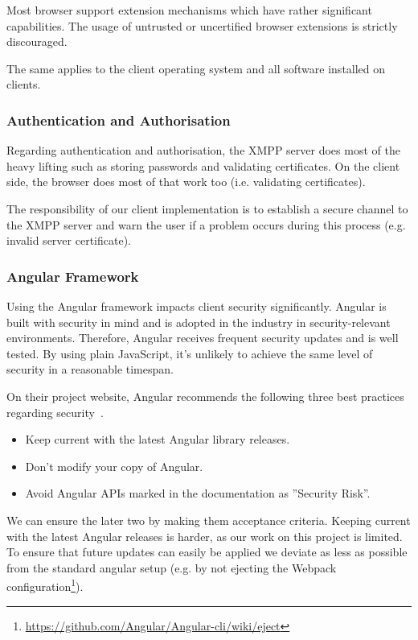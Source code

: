 Most browser support extension mechanisms which have rather significant capabilities.
The usage of untrusted or uncertified browser extensions is strictly discouraged.~\cite{browser-extension-security}

The same applies to the client operating system and all software installed on clients.

\subsubsection{Authentication and Authorisation}

Regarding authentication and authorisation, the XMPP server does most of the heavy lifting such as storing passwords and validating certificates.
On the client side, the browser does most of that work too (i.e. validating certificates).

The responsibility of our client implementation is to establish a secure channel to the XMPP server and warn the user if a problem occurs during this process (e.g. invalid server certificate).

\subsubsection{Angular Framework}

Using the Angular framework impacts client security significantly.
Angular is built with security in mind and is adopted in the industry in security-relevant environments.
Therefore, Angular receives frequent security updates and is well tested.
By using plain JavaScript, it's unlikely to achieve the same level of security in a reasonable timespan.

On their project website, Angular recommends the following three best practices regarding security~\cite{angular-security}.

\begin{itemize}
    \item Keep current with the latest Angular library releases.
    \item Don't modify your copy of Angular.
    \item Avoid Angular APIs marked in the documentation as ''Security Risk''.
\end{itemize}

We can ensure the later two by making them acceptance criteria.
Keeping current with the latest Angular releases is harder, as our work on this project is limited.
To ensure that future updates can easily be applied we deviate as less as possible from the standard angular setup (e.g. by not ejecting the Webpack configuration\footnote{\url{https://github.com/Angular/Angular-cli/wiki/eject}}).

